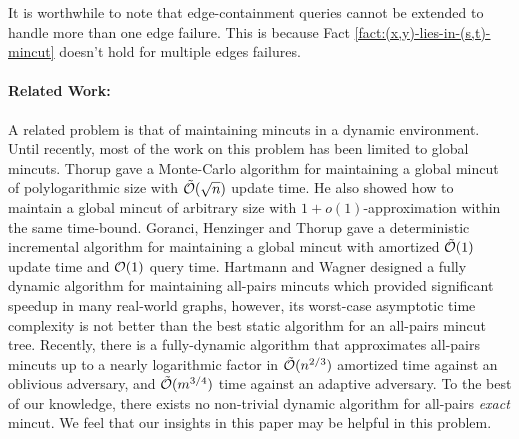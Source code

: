 \begin{remark}
It is worthwhile to note that edge-containment queries cannot be extended to handle more than one edge failure. This is because Fact \ref{fact:(x,y)-lies-in-(s,t)-mincut} doesn't hold for multiple edges failures.
\end{remark}




\paragraph{Related Work:} A related problem is that of maintaining mincuts in a dynamic environment. Until recently, most of the work on this problem has been limited to global mincuts. Thorup \cite{DBLP:journals/combinatorica/Thorup07} gave a Monte-Carlo algorithm for maintaining a global mincut of polylogarithmic size with ${\tilde {\cal O}}(\sqrt{n})$ update time.  He also showed how to maintain a global mincut of arbitrary size with $1+o(1)$-approximation within the same time-bound. Goranci, Henzinger and Thorup \cite{DBLP:journals/talg/GoranciHT18} gave a deterministic incremental algorithm for maintaining a global mincut with amortized ${\tilde{\cal O}}(1)$ update time and ${\cal O}(1)$ query time. Hartmann and Wagner \cite{DBLP:conf/isaac/HartmannW12} designed a fully dynamic algorithm for maintaining all-pairs mincuts  which provided significant speedup in many real-world graphs, however, its worst-case asymptotic time complexity is not better than the best static algorithm for an all-pairs mincut tree. Recently, there is a fully-dynamic algorithm \cite{DBLP:journals/corr/abs-2005-02368} that approximates all-pairs mincuts up to a nearly logarithmic factor in ${\tilde{\cal O}}(n^{2/3} )$ amortized time against an oblivious adversary, and ${\tilde{\cal O}}(m^{3/4} )$ time against an adaptive adversary. To the best of our knowledge, there exists no non-trivial dynamic algorithm for all-pairs \textit{exact} mincut. We feel that our insights in this paper may be helpful in this problem.

\noindent


